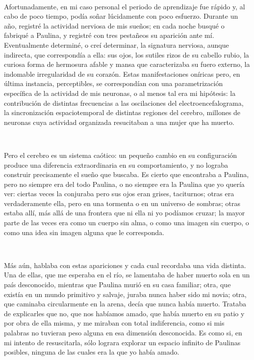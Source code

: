 \documentclass[a4paper, 12pt]{article}
\begin{document}
~

Afortunadamente, en mi caso personal el periodo de aprendizaje fue rápido y, al
cabo de poco tiempo, podía soñar lúcidamente con poco esfuerzo. Durante un año,
registré la actividad nerviosa de mis sueños; en cada noche busqué o fabriqué a
Paulina, y registré con tres pestañeos su aparición ante mí. Eventualmente
determiné, o creí determinar, la signatura nerviosa, aunque indirecta, que
correspondía a ella: sus ojos, los sutiles rizos de su cabello rubio, la curiosa
forma de hermosura afable y mansa que caracterizaba su fuero externo, la
indomable irregularidad de su corazón. Estas manifestaciones oníricas pero, en
última instancia, perceptibles, se correspondían con una parametrización
específica de la actividad de mis neuronas, o al menos tal era mi hipótesis: la
contribución de distintas frecuencias a las oscilaciones del
electroencefalograma, la sincronización espaciotemporal de distintas regiones
del cerebro, millones de neuronas cuya actividad organizada resucitaban a una
mujer que ha muerto.

~

Pero el cerebro es un sistema caótico: un pequeño cambio en su configuración
produce una diferencia extraordinaria en su comportamiento, y no lograba
construir precisamente el sueño que buscaba. Es cierto que encontraba a Paulina,
pero no siempre era del todo Paulina, o no siempre era la Paulina que yo quería
ver: ciertas veces la conjuraba pero sus ojos eran grises, taciturnos; otras era
verdaderamente ella, pero en una tormenta o en un universo de sombras; otras
estaba allí, más allá de una frontera que ni ella ni yo podíamos cruzar; la
mayor parte de las veces era como un cuerpo sin alma, o como una imagen sin
cuerpo, o como una idea sin imagen alguna que le corresponda. 

~

Más aún, hablaba con estas apariciones y cada cual recordaba una vida distinta.
Una de ellas, que me esperaba en el río, se lamentaba de haber muerto sola en un
país desconocido, mientras que Paulina murió en su casa familiar; otra, que
existía en un mundo primitivo y salvaje, juraba nunca haber sido mi novia; otra,
que caminaba circularmente en la arena, decía que nunca había muerto. Trataba de
explicarles que no, que nos habíamos amado, que había muerto en su patio y por
obra de ella misma, y me miraban con total indiferencia, como si mis palabras no
tuvieran peso alguna en esa dimensión desconocida. Es como si, en mi intento de
resuscitarla, sólo lograra explorar un espacio infinito de Paulinas posibles,
ninguna de las cuales era la que yo había amado.
\end{document}
